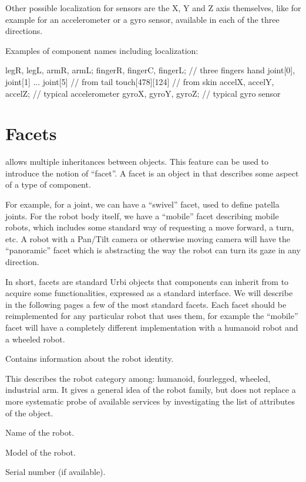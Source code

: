 Other possible localization for sensors are the X, Y and Z axis
themselves, like for example for an accelerometer or a gyro sensor,
available in each of the three directions.


Examples of component names including localization:

\begin{urbifixme}
legR, legL, armR, armL;
fingerR, fingerC, fingerL;      // three fingers hand
joint[0], joint[1] ... joint[5] // from tail
touch[478][124]                 // from skin
accelX, accelY, accelZ;         // typical accelerometer
gyroX, gyroY, gyroZ;            // typical gyro sensor
\end{urbifixme}

\section{Facets}

\urbi allows multiple inheritances between objects. This feature can be
used to introduce the notion of “facet”. A facet is an object in \urbi
that describes some aspect of a type of component.

For example, for a joint, we can have a “swivel” facet, used to define
patella joints. For the robot body itself, we have a “mobile” facet
describing mobile robots, which includes some standard way of
requesting a move forward, a turn, etc. A robot with a Pan/Tilt camera
or otherwise moving camera will have the “panoramic” facet which is
abstracting the way the robot can turn its gaze in any direction.

In short, facets are standard Urbi objects that components can inherit
from to acquire some functionalities, expressed as a standard
interface. We will describe in the following pages a few of the most
standard facets. Each facet should be reimplemented for any particular
robot that uses them, for example the “mobile” facet will have a
completely different implementation with a humanoid robot and a wheeled
robot.


Contains information about the robot identity.

\begin{slots}
  {
    This describes the robot category among: humanoid, fourlegged,
    wheeled, industrial arm. It gives a general idea of the robot
    family, but does not replace a more systematic probe of available
    services by investigating the list of attributes of the object.
  }

  {%
    Name of the robot.%
  }

  {%
    Model of the robot.%
  }

  {%
    Serial number (if available).%
  }

\end{slots}


